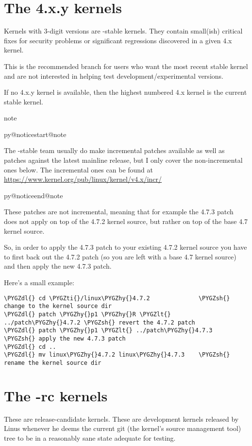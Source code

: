 \documentclass[a4paper,8pt,english]{sphinxmanual}
\makeatletter
\renewenvironment{notice}[2]{%
          \def\py@noticetype{#1}
          \begin{coloredbox}{#1}
          \bf\it
          \par\strong{#2}
          \csname py@noticestart@#1\endcsname
        }
	{
          \csname py@noticeend@\py@noticetype\endcsname
          \end{coloredbox}
        }
\def\PYGZlt{\char`\<}
\def\PYGZsh{\char`\#}
\def\PYGZdl{\char`\$}
\def\PYGZhy{\char`\-}
\def\PYGZti{\char`\~}
\makeatother
\begin{document}
\section{The 4.x.y kernels}
\label{process/applying-patches:the-4-x-y-kernels}
Kernels with 3-digit versions are -stable kernels. They contain small(ish)
critical fixes for security problems or significant regressions discovered
in a given 4.x kernel.

This is the recommended branch for users who want the most recent stable
kernel and are not interested in helping test development/experimental
versions.

If no 4.x.y kernel is available, then the highest numbered 4.x kernel is
the current stable kernel.

\begin{notice}{note}{Note:}
The -stable team usually do make incremental patches available as well
as patches against the latest mainline release, but I only cover the
non-incremental ones below. The incremental ones can be found at
\href{https://www.kernel.org/pub/linux/kernel/v4.x/incr/}{https://www.kernel.org/pub/linux/kernel/v4.x/incr/}
\end{notice}

These patches are not incremental, meaning that for example the 4.7.3
patch does not apply on top of the 4.7.2 kernel source, but rather on top
of the base 4.7 kernel source.

So, in order to apply the 4.7.3 patch to your existing 4.7.2 kernel
source you have to first back out the 4.7.2 patch (so you are left with a
base 4.7 kernel source) and then apply the new 4.7.3 patch.

Here's a small example:

\begin{Verbatim}[commandchars=\\\{\}]
\PYGZdl{} cd \PYGZti{}/linux\PYGZhy{}4.7.2              \PYGZsh{} change to the kernel source dir
\PYGZdl{} patch \PYGZhy{}p1 \PYGZhy{}R \PYGZlt{} ../patch\PYGZhy{}4.7.2 \PYGZsh{} revert the 4.7.2 patch
\PYGZdl{} patch \PYGZhy{}p1 \PYGZlt{} ../patch\PYGZhy{}4.7.3    \PYGZsh{} apply the new 4.7.3 patch
\PYGZdl{} cd ..
\PYGZdl{} mv linux\PYGZhy{}4.7.2 linux\PYGZhy{}4.7.3    \PYGZsh{} rename the kernel source dir
\end{Verbatim}


\section{The -rc kernels}
\label{process/applying-patches:the-rc-kernels}
These are release-candidate kernels. These are development kernels released
by Linus whenever he deems the current git (the kernel's source management
tool) tree to be in a reasonably sane state adequate for testing.
\end{document}
